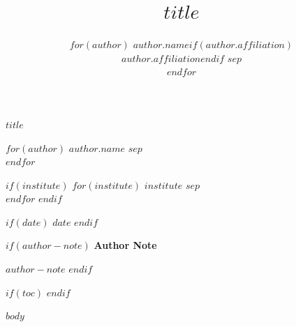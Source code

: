 \documentclass[$if(fontsize)$$fontsize$$else$11pt$endif$,$if(papersize)$$papersize$$else$letterpaper$endif$]{article}
\title{%
  \vspace{2in}
  \textbf{$title$}%
  \vspace{0.5in}%
}
\author{%
  $for(author)$
  $author.name$$if(author.affiliation)$\\$author.affiliation$$endif$
  $sep$\\[1em]
  $endfor$
}
\date{}
\newenvironment{authornote}{%
  \vfill
  \noindent\textbf{Author Note}\par
  \noindent
}{}
\begin{document}
\begin{titlepage}
  \thispagestyle{fancy}

  \begin{center}
    \vspace*{2in}

    {\Large\bfseries\begin{doublespace}$title$\end{doublespace}}

    \vspace{0.5in}

    $for(author)$
    $author.name$
    $sep$\\
    $endfor$

    \vspace{0.5em}

    $if(institute)$
    $for(institute)$
    $institute$
    $sep$\\
    $endfor$
    $endif$

    $if(date)$
    \vspace{0.5em}
    $date$
    $endif$

  \end{center}

  $if(author-note)$
  \begin{authornote}
    $author-note$
  \end{authornote}
  $endif$
\end{titlepage}

$if(toc)$
\newpage
{
  \hypersetup{linkcolor=black}
  \setcounter{tocdepth}{$if(toc-depth)$$toc-depth$$else$2$endif$}
  \renewcommand{\contentsname}{Table of Contents}
  \tableofcontents
  \newpage
}
$endif$

$body$
\end{document}
